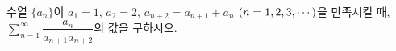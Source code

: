 수열 $\{a_n\}$이 $a_1=1$, $a_2=2$, $a_{n+2}=a_{n+1}+a_n$ $(n=1{,}\mkern3mu\mathopen{}2{,}\mkern3mu\mathopen{}3{,}\mkern3mu\mathopen{}\cdots)$을 만족시킬 때, $\displaystyle\sum_{n=1}^{\infty}\dfrac{a_n}{a_{n+1}a_{n+2}}$의 값을 구하시오.
